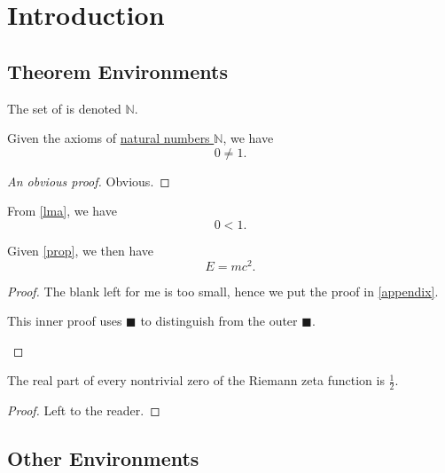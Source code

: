 \chapter{Introduction}
\section{Theorem Environments}

\begin{definition}\label{def}
	The set of  is denoted \(\mathbb{N}\).
\end{definition}

\begin{lemma}\label{lma}
	Given the axioms of \hyperref[def]{natural numbers \(\mathbb{N}\)}, we have
	\[
		0 \neq 1.
	\]
\end{lemma}
\begin{proof}[An obvious proof]
	Obvious.
\end{proof}

\begin{proposition}\label{prop}
	From \autoref{lma}, we have
	\[
		0 < 1.
	\]
\end{proposition}

\begin{theorem}\label{thm}
	Given \autoref{prop}, we then have
	\[
		E = mc^2.
	\]
\end{theorem}
\begin{proof}
	The blank left for me is too small, hence we put the proof in \autoref{appendix}.
	\begin{subproof}
		This inner proof uses $\blacksquare$ to distinguish from the outer $\blacksquare$.
	\end{subproof}
\end{proof}

\begin{corollary}\label{col}
	The real part of every nontrivial zero of the Riemann zeta function is \(\frac{1}{2}\).
\end{corollary}
\begin{proof}
	Left to the reader.
\end{proof}

\hrulebar

\section{Other Environments}

